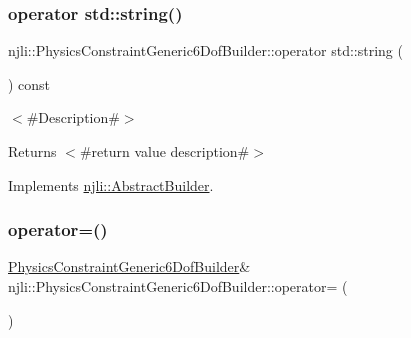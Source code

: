\subsubsection{\texorpdfstring{operator std\+::string()}{operator std::string()}}
{\footnotesize\ttfamily njli\+::\+Physics\+Constraint\+Generic6\+Dof\+Builder\+::operator std\+::string (\begin{DoxyParamCaption}{ }\end{DoxyParamCaption}) const\hspace{0.3cm}{\ttfamily [virtual]}}

$<$\#\+Description\#$>$

\begin{DoxyReturn}{Returns}
$<$\#return value description\#$>$ 
\end{DoxyReturn}


Implements \mbox{\hyperlink{classnjli_1_1_abstract_builder_a3e6e553e06d1ca30517ad5fb0bd4d000}{njli\+::\+Abstract\+Builder}}.

\mbox{\label{classnjli_1_1_physics_constraint_generic6_dof_builder_aaf3ffd63926492c362674c9844ab32a8}} 
\subsubsection{\texorpdfstring{operator=()}{operator=()}}
{\footnotesize\ttfamily \mbox{\hyperlink{classnjli_1_1_physics_constraint_generic6_dof_builder}{Physics\+Constraint\+Generic6\+Dof\+Builder}}\& njli\+::\+Physics\+Constraint\+Generic6\+Dof\+Builder\+::operator= (\begin{DoxyParamCaption}\item[{const \mbox{\hyperlink{classnjli_1_1_physics_constraint_generic6_dof_builder}{Physics\+Constraint\+Generic6\+Dof\+Builder}} \&}]{ }\end{DoxyParamCaption})\hspace{0.3cm}{\ttfamily [protected]}}

\mbox{\label{classnjli_1_1_physics_constraint_generic6_dof_builder_a94439f03a17acc8213e32e3e0f447792}} 
